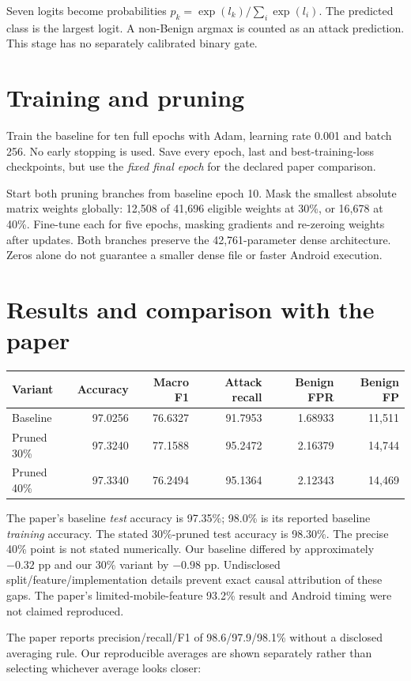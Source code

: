 \documentclass[11pt,a4paper,oneside]{report}
\begin{document}
Seven logits become probabilities $p_k=\exp(l_k)/\sum_i\exp(l_i)$. The predicted class is the largest logit. A non-Benign argmax is counted as an attack prediction. This stage has no separately calibrated binary gate.

\section{Training and pruning}
Train the baseline for ten full epochs with Adam, learning rate 0.001 and batch 256. No early stopping is used. Save every epoch, last and best-training-loss checkpoints, but use the \emph{fixed final epoch} for the declared paper comparison.

Start both pruning branches from baseline epoch 10. Mask the smallest absolute matrix weights globally: 12,508 of 41,696 eligible weights at 30\%, or 16,678 at 40\%. Fine-tune each for five epochs, masking gradients and re-zeroing weights after updates. Both branches preserve the 42,761-parameter dense architecture. Zeros alone do not guarantee a smaller dense file or faster Android execution.

\section{Results and comparison with the paper}

{\small
\begin{longtable}{@{}lrrrrr@{}}
\toprule
Variant & Accuracy & Macro F1 & Attack recall & Benign FPR & Benign FP\\\midrule\endhead
Baseline & 97.0256 & 76.6327 & 91.7953 & 1.68933 & 11,511\\
Pruned 30\% & 97.3240 & 77.1588 & 95.2472 & 2.16379 & 14,744\\
Pruned 40\% & 97.3340 & 76.2494 & 95.1364 & 2.12343 & 14,469\\
\bottomrule\end{longtable}
}

The paper's baseline \emph{test} accuracy is 97.35\%; 98.0\% is its reported baseline \emph{training} accuracy. The stated 30\%-pruned test accuracy is 98.30\%. The precise 40\% point is not stated numerically. Our baseline differed by approximately $-0.32$ pp and our 30\% variant by $-0.98$ pp. Undisclosed split/feature/implementation details prevent exact causal attribution of these gaps. The paper's limited-mobile-feature 93.2\% result and Android timing were not claimed reproduced.

The paper reports precision/recall/F1 of 98.6/97.9/98.1\% without a disclosed averaging rule. Our reproducible averages are shown separately rather than selecting whichever average looks closer:
\end{document}
